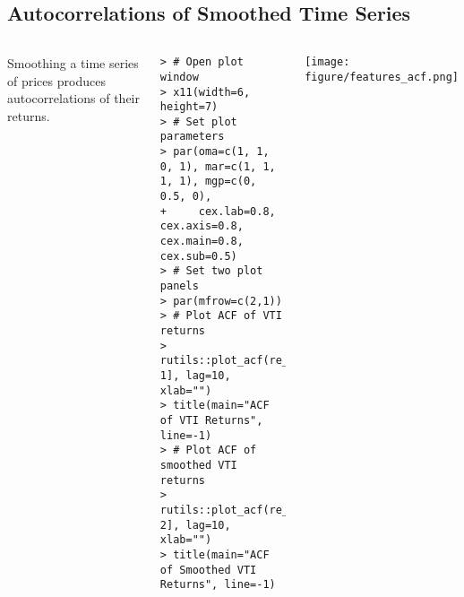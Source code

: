 \documentclass[10pt]{beamer}\usepackage[]{graphicx}\usepackage[]{color}
\makeatletter
\newenvironment{kframe}{%
 \def\at@end@of@kframe{}%
 \ifinner\ifhmode%
  \def\at@end@of@kframe{\end{minipage}}%
  \begin{minipage}{\columnwidth}%
 \fi\fi%
 \def\FrameCommand##1{\hskip\@totalleftmargin \hskip-\fboxsep
 \colorbox{shadecolor}{##1}\hskip-\fboxsep
     \hskip-\linewidth \hskip-\@totalleftmargin \hskip\columnwidth}%
 \MakeFramed {\advance\hsize-\width
   \@totalleftmargin\z@ \linewidth\hsize
   \@setminipage}}%
 {\par\unskip\endMakeFramed%
 \at@end@of@kframe}
\newenvironment{knitrout}{}{} %
\makeatother
\begin{document}
\subsection{Autocorrelations of Smoothed Time Series}
\begin{frame}[fragile,t]{\subsecname}
\vspace{-1em}
\begin{block}{}
  \begin{columns}[T]
      Smoothing a time series of prices produces autocorrelations of their returns.
\begin{knitrout}\tiny
{}\color{fgcolor}\begin{kframe}
\begin{verbatim}
> # Open plot window
> x11(width=6, height=7)
> # Set plot parameters
> par(oma=c(1, 1, 0, 1), mar=c(1, 1, 1, 1), mgp=c(0, 0.5, 0),
+     cex.lab=0.8, cex.axis=0.8, cex.main=0.8, cex.sub=0.5)
> # Set two plot panels
> par(mfrow=c(2,1))
> # Plot ACF of VTI returns
> rutils::plot_acf(re_turns[, 1], lag=10, xlab="")
> title(main="ACF of VTI Returns", line=-1)
> # Plot ACF of smoothed VTI returns
> rutils::plot_acf(re_turns[, 2], lag=10, xlab="")
> title(main="ACF of Smoothed VTI Returns", line=-1)
\end{verbatim}
\end{kframe}
\end{knitrout}
      \vspace{-1em}
      \texttt{[image: figure/features\_acf.png]}
  \end{columns}
\end{block}

\end{frame}


\end{document}

